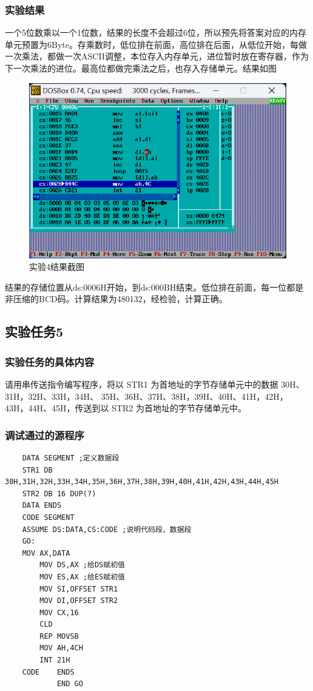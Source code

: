 \documentclass[12pt, a4paper, oneside]{ctexart}
\begin{document}
\subsubsection{实验结果}
一个5位数乘以一个1位数，结果的长度不会超过6位，所以预先将答案对应的内存单元预置为6Byte。存乘数时，低位排在前面，高位排在后面，从低位开始，每做一次乘法，都做一次ASCII调整，本位存入内存单元，进位暂时放在寄存器，作为下一次乘法的进位。最高位都做完乘法之后，也存入存储单元。结果如图
\begin{figure}[H]
    \centering
    \includegraphics[scale=0.6]{pic/exp1_4.png}
    \caption{实验4结果截图}
\end{figure}
结果的存储位置从ds:0006H开始，到ds:000BH结束。低位排在前面，每一位都是非压缩的BCD码。计算结果为480132，经检验，计算正确。
\subsection{实验任务5}
\subsubsection{实验任务的具体内容}
请用串传送指令编写程序，将以 STR1 为首地址的字节存储单元中的数据 30H、31H，32H、33H，34H、
35H、36H、37H、38H，39H、40H、41H，42H，43H，44H、45H，传送到以 STR2 为首地址的字节存储单元中。
\subsubsection{调试通过的源程序}
\begin{lstlisting}
    DATA SEGMENT ;定义数据段
    STR1 DB 30H,31H,32H,33H,34H,35H,36H,37H,38H,39H,40H,41H,42H,43H,44H,45H
    STR2 DB 16 DUP(?) 
    DATA ENDS
    CODE SEGMENT 
    ASSUME DS:DATA,CS:CODE ;说明代码段、数据段
    GO: 
    MOV AX,DATA 
        MOV DS,AX ;给DS赋初值
        MOV ES,AX ;给ES赋初值
        MOV SI,OFFSET STR1 
        MOV DI,OFFSET STR2
        MOV CX,16
        CLD
        REP MOVSB
        MOV AH,4CH
        INT 21H
    CODE 	ENDS
            END GO
\end{lstlisting}
\end{document}
